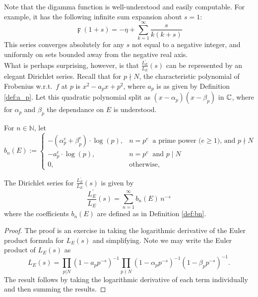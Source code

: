 \documentclass[10pt]{article}
\newcommand{\NN}{\mathbb{N}}
\newcommand{\pr}{^{\prime}}
\newcommand{\Les}{L_E(s)}
\newcommand{\ldLes}{\frac{L_E\pr}{L_E}(s)}
\newcommand{\ldLe}[1]{\frac{L_E\pr}{L_E}\left(#1\right)}
\begin{document}
Note that the digamma function is well-understood and easily computable. For example, it has the following infinite sum expansion about $s=1$:
\begin{equation}\label{eqn:digamma_sum}
\digamma(1+s) = -\eta + \sum_{k=1}^{\infty} \frac{s}{k(k+s)}
\end{equation}
This series converges absolutely for any $s$ not equal to a negative integer, and uniformly on sets bounded away from the negative real axis.\\

What is perhaps surprising, however, is that $\ldLe{s}$ can be represented by an elegant Dirichlet series. Recall that for $p \nmid N$, the characteristic polynomial of Frobenius w.r.t.~$f$ at $p$ is $x^2 - a_p x + p^2$, where $a_p$ is as given by Definition \ref{def:a_p}. Let this quadratic polynomial split as $(x-\alpha_p)(x-\beta_p)$ in $\mathbb{C}$, where for $\alpha_p$ and $\beta_p$ the dependance on $E$ is understood. \\

\begin{definition}\label{def:bn}
For $n \in \NN$, let
\begin{equation}
b_n(E) := \begin{cases}
-\left(\alpha_p^e+\beta_p^e\right)\cdot \log(p), & n=p^e\;\;\text{a prime power ($e\ge1$), and $p \nmid N$} \\
-a_p^e \cdot \log(p), & n=p^e\;\;\text{and $p \mid N$} \\
0, & \text{otherwise,} \end{cases}
\end{equation}
\end{definition}

\begin{lemma}
The Dirichlet series for $\ldLes$ is given by
\begin{equation}
\ldLes = \sum_{n=1}^{\infty} b_n(E)\, n^{-s}
\end{equation}
where the coefficients $b_n(E)$ are defined as in Definition \ref{def:bn}. \\
\end{lemma}
\begin{proof}
The proof is an exercise in taking the logarithmic derivative of the Euler product formula for $\Les$ and simplifying. Note we may write the Euler product of $\Les$ as
\begin{equation}
\Les = \prod_{p|N} \left(1-a_p p^{-s}\right)^{-1} \prod_{p\nmid N} \left(1-\alpha_p p^{-s}\right)^{-1}\left(1-\beta_p p^{-s}\right)^{-1}.
\end{equation}
The result follows by taking the logarithmic derivative of each term individually and then summing the results.
\end{proof}
\end{document}
